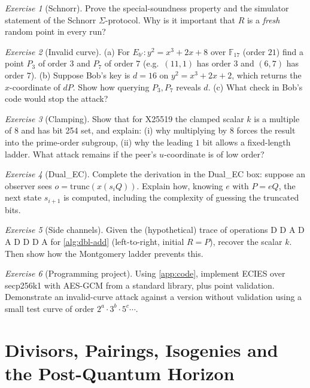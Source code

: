 \documentclass[11pt,a4paper,oneside]{book}
\theoremstyle{plain}
\theoremstyle{definition}
\theoremstyle{remark}
\newtheorem{exercise}{Exercise}[chapter]
\newcommand{\F}{\mathbb{F}}
\begin{document}
\begin{exercise}[Schnorr]
Prove the special-soundness property and the simulator statement of the Schnorr $\Sigma$-protocol. Why is it important that $R$ is a \emph{fresh} random point in every run?
\end{exercise}

\begin{exercise}[Invalid curve]
(a) For $E_{b'}:y^2=x^3+2x+8$ over $\F_{17}$ (order $21$) find a point $P_3$ of order $3$ and $P_7$ of order $7$ (e.g.\ $(11,1)$ has order $3$ and $(6,7)$ has order $7$). (b) Suppose Bob's key is $d=16$ on $y^2=x^3+2x+2$, which returns the $x$-coordinate of $dP$. Show how querying $P_3,P_7$ reveals $d$. (c) What check in Bob's code would stop the attack?
\end{exercise}

\begin{exercise}[Clamping]
Show that for X25519 the clamped scalar $k$ is a multiple of $8$ and has bit 254 set, and explain: (i) why multiplying by $8$ forces the result into the prime-order subgroup, (ii) why the leading $1$ bit allows a fixed-length ladder. What attack remains if the peer's $u$-coordinate is of low order?
\end{exercise}

\begin{exercise}[Dual\_EC]
Complete the derivation in the Dual\_EC box: suppose an observer sees $o=\mathrm{trunc}(x(s_iQ))$. Explain how, knowing $e$ with $P=eQ$, the next state $s_{i+1}$ is computed, including the complexity of guessing the truncated bits.
\end{exercise}

\begin{exercise}[Side channels]
Given the (hypothetical) trace of operations D D A D A D D D A for \cref{alg:dbl-add} (left-to-right, initial $R=P$), recover the scalar $k$. Then show how the Montgomery ladder prevents this.
\end{exercise}

\begin{exercise}[Programming project]
Using \cref{app:code}, implement ECIES over secp256k1 with AES-GCM from a standard library, plus point validation. Demonstrate an invalid-curve attack against a version without validation using a small test curve of order $2^a\cdot3^b\cdot5^c\cdots$.
\end{exercise}
\chapter{Divisors, Pairings, Isogenies and the Post-Quantum Horizon}\label{ch:L5}
\end{document}
